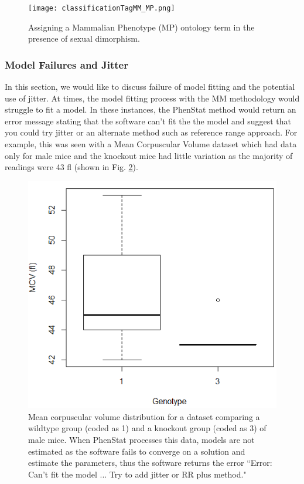 \documentclass[12pt,a4paper]{article}
\begin{document}
\begin{figure}[!tpb]%
\centerline{\texttt{[image: classificationTagMM\_MP.png]}}
\caption{Assigning a Mammalian Phenotype (MP) ontology term in the presence of sexual dimorphism. }\label{fig:05_2}
\end{figure}


\subsubsection{Model Failures and Jitter}
In this section, we would like to discuss failure of model fitting and the potential use of jitter.
At times,  the model fitting process with the MM methodology would struggle to fit a model.  In these instances,  the PhenStat method would return  an error message stating that the software can’t fit the the model  and suggest that you could try jitter or an alternate method such as reference range approach. For example,  this was seen with a Mean Corpuscular Volume dataset which had data only for male mice and the knockout mice had little variation as the majority of readings were 43 fl (shown in Fig. \ref{fig:05_x}).

\begin{figure}[!tpb]%
\centerline{\includegraphics[scale=0.6]{Jitter_figureX.png}}
\caption{Mean corpuscular volume distribution for a dataset comparing a wildtype group (coded as 1) and a knockout group (coded as 3) of male mice.
When PhenStat processes this data,  models are not estimated as the software fails to converge on a solution and estimate the parameters,  thus the software returns the error “Error: Can’t fit the model ... Try to add jitter or RR plus method."}\label{fig:05_x}
\end{figure}
\end{document}
